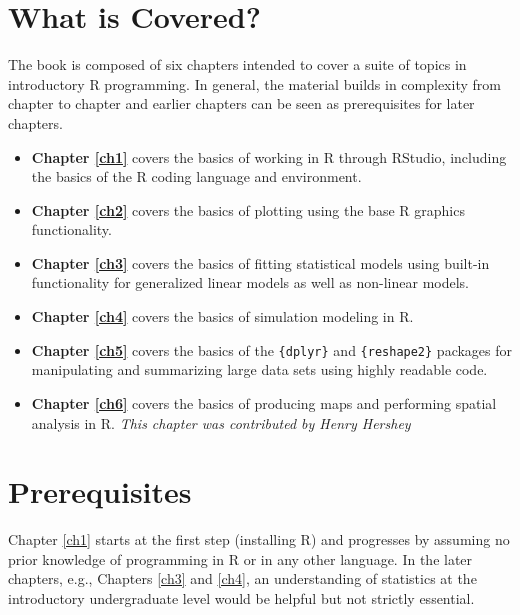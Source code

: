 \documentclass[]{book}
\providecommand{\tightlist}{%
  \setlength{\itemsep}{0pt}\setlength{\parskip}{0pt}}
\begin{document}
\hypertarget{what-is-covered}{%
\section*{What is Covered?}\label{what-is-covered}}

The book is composed of six chapters intended to cover a suite of topics in introductory R programming. In general, the material builds in complexity from chapter to chapter and earlier chapters can be seen as prerequisites for later chapters.

\begin{itemize}
\tightlist
\item
  \textbf{Chapter \ref{ch1}} covers the basics of working in R through RStudio, including the basics of the R coding language and environment.
\item
  \textbf{Chapter \ref{ch2}} covers the basics of plotting using the base R graphics functionality.
\item
  \textbf{Chapter \ref{ch3}} covers the basics of fitting statistical models using built-in functionality for generalized linear models as well as non-linear models.\\
\item
  \textbf{Chapter \ref{ch4}} covers the basics of simulation modeling in R.
\item
  \textbf{Chapter \ref{ch5}} covers the basics of the \texttt{\{dplyr\}} and \texttt{\{reshape2\}} packages for manipulating and summarizing large data sets using highly readable code.
\item
  \textbf{Chapter \ref{ch6}} covers the basics of producing maps and performing spatial analysis in R. \emph{This chapter was contributed by Henry Hershey}
\end{itemize}

\hypertarget{prerequisites}{%
\section*{Prerequisites}\label{prerequisites}}

Chapter \ref{ch1} starts at the first step (installing R) and progresses by assuming no prior knowledge of programming in R or in any other language. In the later chapters, e.g., Chapters \ref{ch3} and \ref{ch4}, an understanding of statistics at the introductory undergraduate level would be helpful but not strictly essential.
\end{document}
